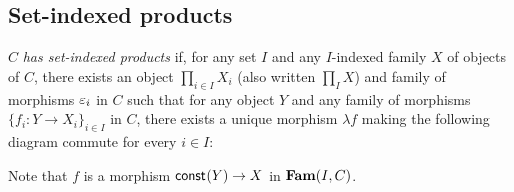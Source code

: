 \subsection{Set-indexed products}
\label{sec:set-indexed-product}

$C$ \emph{has set-indexed products} if, for any set $I$ and any $I$-indexed family $X$ of objects of $C$,
there exists an object $\prod_{i \in I}X_i$ (also written $\prod_{I} X$) and family of morphisms $\varepsilon_i$ in
$C$ such that for any object $Y$ and any family of morphisms $\{f_i: Y \to X_i\}_{i \in I}$ in $C$, there
exists a unique morphism $\lambda f$ making the following diagram commute for every $i \in I$:

\begin{center}
\end{center}

Note that $f$ is a morphism $\mathsf{const}_{}(Y) \to X$ in $\mathbf{Fam}(I,C)$.

